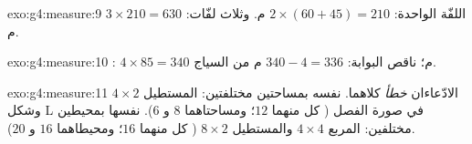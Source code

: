\begin{solution}{exo:g4:measure:9}
اللفّة الواحدة: $2 \times (60 + 45) = 210$ م. وثلاث لفّات:
$3 \times 210 = 630$ م.
\end{solution}

\begin{solution}{exo:g4:measure:10}
: $4 \times 85 = 340$ م؛ ناقص البوابة:
$340 - 4 = 336$ م من السياج.
\end{solution}

\begin{solution}{exo:g4:measure:11}
الادّعاءان \emph{خطأ} كلاهما.  نفسه بمساحتين مختلفتين:
المستطيل $4 \times 2$ وشكل L في صورة الفصل ( كل
منهما $12$؛ ومساحتاهما $8$ و $6$).  نفسها بمحيطين
مختلفين: المربع $4 \times 4$ والمستطيل $8 \times 2$
( كل منهما $16$؛ ومحيطاهما $16$ و $20$).
\end{solution}
